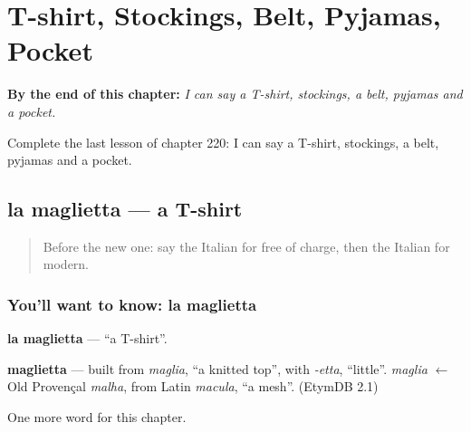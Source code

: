 
\chapter{T-shirt, Stockings, Belt, Pyjamas, Pocket}
\label{ch:it-t-shirt-stockings-belt-pyjamas-pocket}

\begin{chapteropening}
\textbf{By the end of this chapter:} \emph{I can say a T-shirt, stockings, a belt, pyjamas and a pocket.}

Complete the last lesson of chapter 220: I can say a T-shirt, stockings, a belt, pyjamas and a pocket.
\end{chapteropening}

\section[la maglietta]{la maglietta — a T-shirt}

\label{lesson:IT-C220-maglietta}



\begin{quote}
Before the new one: say the Italian for free of charge, then the Italian for modern.
\end{quote}

\subsection*{You'll want to know: la maglietta}
\textbf{la maglietta} — \textquotedblleft{}a T-shirt\textquotedblright{}.

\begin{cousinweb}
\textbf{maglietta} — built from \emph{maglia}, \textquotedblleft{}a knitted top\textquotedblright{}, with \emph{-etta}, \textquotedblleft{}little\textquotedblright{}. \emph{maglia} $\leftarrow$ Old Provençal \emph{malha}, from Latin \emph{macula}, \textquotedblleft{}a mesh\textquotedblright{}. (EtymDB 2.1)
\end{cousinweb}

\begin{grammarlens}[title={What you've built}]
One more word for this chapter.
\end{grammarlens}


